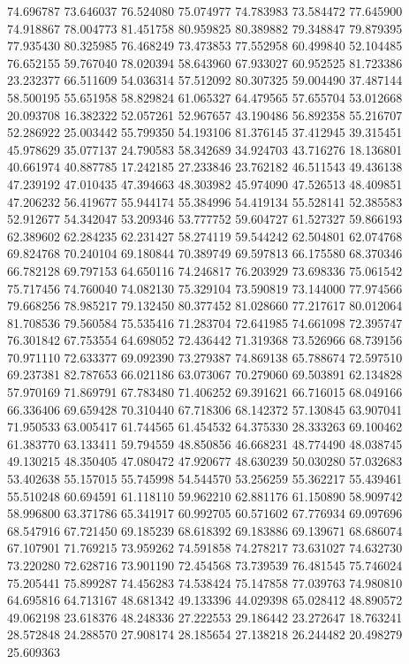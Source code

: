 74.696787
73.646037
76.524080
75.074977
74.783983
73.584472
77.645900
74.918867
78.004773
81.451758
80.959825
80.389882
79.348847
79.879395
77.935430
80.325985
76.468249
73.473853
77.552958
60.499840
52.104485
76.652155
59.767040
78.020394
58.643960
67.933027
60.952525
81.723386
23.232377
66.511609
54.036314
57.512092
80.307325
59.004490
37.487144
58.500195
55.651958
58.829824
61.065327
64.479565
57.655704
53.012668
20.093708
16.382322
52.057261
52.967657
43.190486
56.892358
55.216707
52.286922
25.003442
55.799350
54.193106
81.376145
37.412945
39.315451
45.978629
35.077137
24.790583
58.342689
34.924703
43.716276
18.136801
40.661974
40.887785
17.242185
27.233846
23.762182
46.511543
49.436138
47.239192
47.010435
47.394663
48.303982
45.974090
47.526513
48.409851
47.206232
56.419677
55.944174
55.384996
54.419134
55.528141
52.385583
52.912677
54.342047
53.209346
53.777752
59.604727
61.527327
59.866193
62.389602
62.284235
62.231427
58.274119
59.544242
62.504801
62.074768
69.824768
70.240104
69.180844
70.389749
69.597813
66.175580
68.370346
66.782128
69.797153
64.650116
74.246817
76.203929
73.698336
75.061542
75.717456
74.760040
74.082130
75.329104
73.590819
73.144000
77.974566
79.668256
78.985217
79.132450
80.377452
81.028660
77.217617
80.012064
81.708536
79.560584
75.535416
71.283704
72.641985
74.661098
72.395747
76.301842
67.753554
64.698052
72.436442
71.319368
73.526966
68.739156
70.971110
72.633377
69.092390
73.279387
74.869138
65.788674
72.597510
69.237381
82.787653
66.021186
63.073067
70.279060
69.503891
62.134828
57.970169
71.869791
67.783480
71.406252
69.391621
66.716015
68.049166
66.336406
69.659428
70.310440
67.718306
68.142372
57.130845
63.907041
71.950533
63.005417
61.744565
61.454532
64.375330
28.333263
69.100462
61.383770
63.133411
59.794559
48.850856
46.668231
48.774490
48.038745
49.130215
48.350405
47.080472
47.920677
48.630239
50.030280
57.032683
53.402638
55.157015
55.745998
54.544570
53.256259
55.362217
55.439461
55.510248
60.694591
61.118110
59.962210
62.881176
61.150890
58.909742
58.996800
63.371786
65.341917
60.992705
60.571602
67.776934
69.097696
68.547916
67.721450
69.185239
68.618392
69.183886
69.139671
68.686074
67.107901
71.769215
73.959262
74.591858
74.278217
73.631027
74.632730
73.220280
72.628716
73.901190
72.454568
73.739539
76.481545
75.746024
75.205441
75.899287
74.456283
74.538424
75.147858
77.039763
74.980810
64.695816
64.713167
48.681342
49.133396
44.029398
65.028412
48.890572
49.062198
23.618376
48.248336
27.222553
29.186442
23.272647
18.763241
28.572848
24.288570
27.908174
28.185654
27.138218
26.244482
20.498279
25.609363
